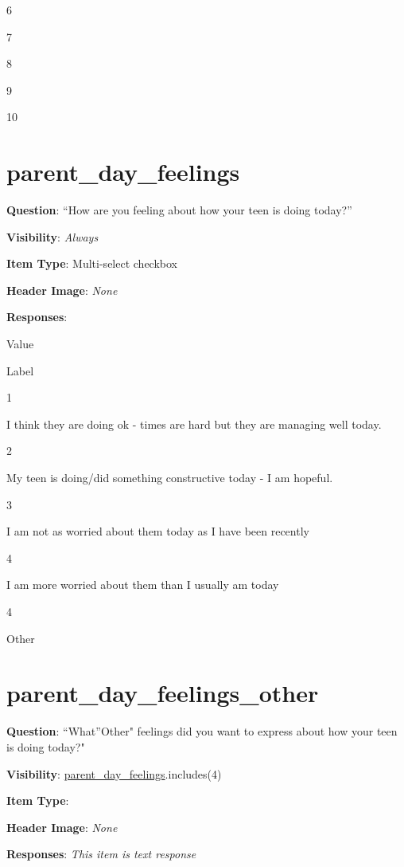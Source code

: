 \documentclass[]{book}
\begin{document}
6

7

8

9

10

\hypertarget{parent_day_feelings}{%
\section{parent\_day\_feelings}\label{parent_day_feelings}}

\textbf{Question}: ``How are you feeling about how your teen is doing today?''

\textbf{Visibility}: \emph{Always}

\textbf{Item Type}: Multi-select checkbox

\textbf{Header Image}: \emph{None}

\textbf{Responses}:

Value

Label

1

I think they are doing ok - times are hard but they are managing well today.

2

My teen is doing/did something constructive today - I am hopeful.

3

I am not as worried about them today as I have been recently

4

I am more worried about them than I usually am today

4

Other

\hypertarget{parent_day_feelings_other}{%
\section{parent\_day\_feelings\_other}\label{parent_day_feelings_other}}

\textbf{Question}: ``What''Other" feelings did you want to express about how your teen is doing today?"

\textbf{Visibility}: \protect\hyperlink{parent_day_feelings}{parent\_day\_feelings}.includes(4)

\textbf{Item Type}:

\textbf{Header Image}: \emph{None}

\textbf{Responses}: \emph{This item is text response}


\end{document}
